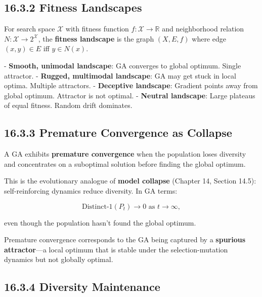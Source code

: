 \subsection{16.3.2 Fitness Landscapes}

\begin{definition}
For search space $\mathcal{X}$ with fitness function $f: \mathcal{X} \to \mathbb{R}$ and neighborhood relation $N: \mathcal{X} \to 2^{\mathcal{X}}$, the \textbf{fitness landscape} is the graph $(X, E, f)$ where edge $(x, y) \in E$ iff $y \in N(x)$.
\end{definition}

\begin{proposition}
- \textbf{Smooth, unimodal landscape}: GA converges to global optimum. Single attractor.
- \textbf{Rugged, multimodal landscape}: GA may get stuck in local optima. Multiple attractors.
- \textbf{Deceptive landscape}: Gradient points away from global optimum. Attractor is not optimal.
- \textbf{Neutral landscape}: Large plateaus of equal fitness. Random drift dominates.
\end{proposition}

\subsection{16.3.3 Premature Convergence as Collapse}

\begin{definition}
A GA exhibits \textbf{premature convergence} when the population loses diversity and concentrates on a suboptimal solution before finding the global optimum.

This is the evolutionary analogue of \textbf{model collapse} (Chapter 14, Section 14.5): self-reinforcing dynamics reduce diversity. In GA terms:

\[\mathrm{Distinct\text{-}1}(P_t) \to 0 \text{ as } t \to \infty,\]

even though the population hasn't found the global optimum.
\end{definition}

\begin{proposition}
Premature convergence corresponds to the GA being captured by a \textbf{spurious attractor}---a local optimum that is stable under the selection-mutation dynamics but not globally optimal.
\end{proposition}

\subsection{16.3.4 Diversity Maintenance}


